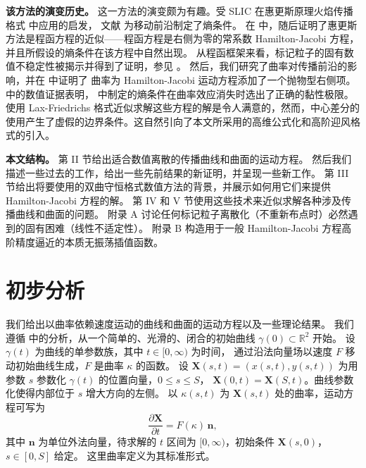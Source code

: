 \documentclass[11pt,a4paper]{article}
\begin{document}
\medskip
\textbf{该方法的演变历史。}
这一方法的演变颇为有趣。受 SLIC \cite{noh1976} 在惠更斯原理火焰传播格式 \cite{chorin1980} 中应用的启发，
文献 \cite{sethian1982} 为移动前沿制定了熵条件。
在 \cite{sethian1982} 中，随后证明了惠更斯方法是程函方程的近似——程函方程是右侧为零的常系数 Hamilton-Jacobi 方程，
并且所假设的熵条件在该方程中自然出现。
从程函框架来看，标记粒子的固有数值不稳定性被揭示并得到了证明，参见 \cite{sethian1982, sethian1987b}。
然后，我们研究了曲率对传播前沿的影响，并在 \cite{sethian1985, sethian1987a, sethian1986} 中证明了
曲率为 Hamilton-Jacobi 运动方程添加了一个抛物型右侧项。
\cite{sethian1985} 中的数值证据表明，\cite{sethian1982} 中制定的熵条件在曲率效应消失时选出了正确的黏性极限。
使用 Lax-Friedrichs 格式近似求解这些方程的解是令人满意的，然而，中心差分的
使用产生了虚假的边界条件。这自然引向了本文所采用的高维公式化和高阶迎风格式的引入。

\medskip
\textbf{本文结构。}
第 II 节给出适合数值离散的传播曲线和曲面的运动方程。
然后我们描述一些过去的工作，给出一些先前结果的新证明，并呈现一些新工作。
第 III 节给出将要使用的双曲守恒格式数值方法的背景，并展示如何用它们来提供 Hamilton-Jacobi 方程的解。
第 IV 和 V 节使用这些技术来近似求解各种涉及传播曲线和曲面的问题。
附录 A 讨论任何标记粒子离散化（不重新布点时）必然遇到的固有困难（线性不适定性）。
附录 B 构造用于一般 Hamilton-Jacobi 方程高阶精度逼近的本质无振荡插值函数。

\section{初步分析}
\label{sec:analysis}

我们给出以曲率依赖速度运动的曲线和曲面的运动方程以及一些理论结果。
我们遵循 \cite{sethian1985} 中的分析，从一个简单的、光滑的、闭合的初始曲线 $\gamma(0) \subset \mathbb{R}^2$ 开始。
设 $\gamma(t)$ 为曲线的单参数族，其中 $t \in [0,\infty)$ 为时间，
通过沿法向量场以速度 $F$ 移动初始曲线生成，$F$ 是曲率 $\kappa$ 的函数。
设 $\mathbf{X}(s,t) = (x(s,t), y(s,t))$ 为用参数 $s$ 参数化 $\gamma(t)$ 的位置向量，$0 \leq s \leq S$，
$\mathbf{X}(0,t) = \mathbf{X}(S,t)$。曲线参数化使得内部位于 $s$ 增大方向的左侧。
以 $\kappa(s,t)$ 为 $\mathbf{X}(s,t)$ 处的曲率，运动方程可写为
\begin{equation}
\frac{\partial \mathbf{X}}{\partial t} = F(\kappa)\,\mathbf{n},
\label{eq:2.1}
\end{equation}
其中 $\mathbf{n}$ 为单位外法向量，待求解的 $t$ 区间为 $[0,\infty)$，初始条件 $\mathbf{X}(s,0)$，$s \in [0,S]$ 给定。
这里曲率定义为其标准形式。
\end{document}
